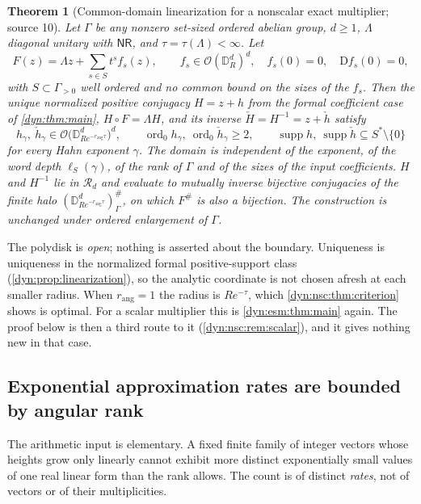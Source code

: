 \documentclass[11pt,letterpaper]{article}
\newtheorem{theorem}{Theorem}[section]
\theoremstyle{definition}
\theoremstyle{remark}
\newcommand{\OO}{\mathcal O}
\newcommand{\supp}{\operatorname{supp}}
\newcommand{\ord}{\operatorname{ord}}
\newcommand{\nres}{\mathsf{NR}}
\newcommand{\rang}{r_{\mathrm{ang}}}
\numberwithin{equation}{section}
\begin{document}
\begin{theorem}[Common-domain linearization for a nonscalar exact multiplier;
source 10]\label{dyn:nsc:thm:main}
Let $\Gamma$ be any nonzero set-sized ordered abelian group, $d\ge1$,
$\Lambda$ diagonal unitary with $\nres$, and $\tau=\tau(\Lambda)<\infty$. Let
\begin{equation}\label{dyn:nsc:eq:input}
 F(z)=\Lambda z+\sum_{s\in S}t^{s}f_s(z),\qquad
 f_s\in\OO(\mathbb D_R^{d})^{d},\quad f_s(0)=0,\quad \mathrm Df_s(0)=0,
\end{equation}
with $S\subset\Gamma_{>0}$ well ordered and no common bound on the sizes of
the $f_s$. Then the unique normalized positive conjugacy $H=z+h$ from the formal
coefficient case of \cref{dyn:thm:main}, $H\circ F=\Lambda H$, and its inverse
$\check H=H^{-1}=z+\check h$ satisfy
\begin{equation}\label{dyn:nsc:eq:main}
 h_\gamma,\ \check h_\gamma\in\OO\bigl(\mathbb D^{d}_{Re^{-\rang\tau}}\bigr)^{d},
 \qquad \ord_0h_\gamma,\ \ord_0\check h_\gamma\ge2,
 \qquad \supp h,\ \supp\check h\subseteq S^{*}\setminus\{0\}
\end{equation}
for every Hahn exponent $\gamma$. The domain is independent of the exponent,
of the word depth $\ell_S(\gamma)$, of the rank of $\Gamma$ and of the sizes
of the input coefficients. $H$ and $H^{-1}$ lie in $\mathcal R_d$ and evaluate
to mutually inverse bijective conjugacies of the finite halo
$(\mathbb D^{d}_{Re^{-\rang\tau}})^{\#}_\Gamma$, on which $F^{\#}$ is also a
bijection. The construction is unchanged under ordered enlargement of
$\Gamma$.
\end{theorem}

The polydisk is \emph{open}; nothing is asserted about the boundary.
Uniqueness is uniqueness in the normalized formal positive-support class
(\cref{dyn:prop:linearization}), so the analytic coordinate is not chosen
afresh at each smaller radius. When $\rang=1$ the radius is $Re^{-\tau}$,
which \cref{dyn:nsc:thm:criterion} shows is optimal. For a scalar multiplier
this is \cref{dyn:esm:thm:main} again. The proof below is then a third route
to it (\cref{dyn:nsc:rem:scalar}), and it gives nothing new in that case.

\subsection{Exponential approximation rates are bounded by angular rank}
\label{dyn:nsc:subsec:rates}

The arithmetic input is elementary. A fixed finite family of integer vectors
whose heights grow only linearly cannot exhibit more distinct exponentially
small values of one real linear form than the rank allows. The count is of
distinct \emph{rates}, not of vectors or of their multiplicities.
\end{document}
